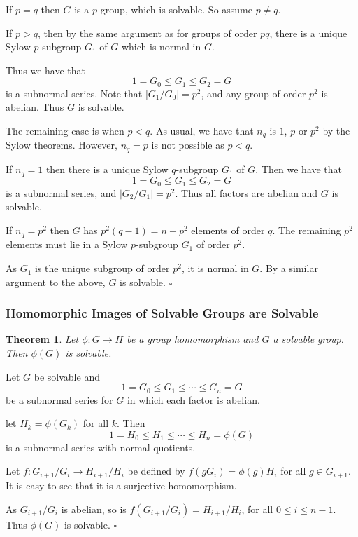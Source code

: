 \documentclass[10pt]{article}
\newtheorem{theorem}{Theorem}[section]
\newenvironment{proof}[1][Proof]{\begin{trivlist}
\item[\hskip \labelsep {\itshape #1}]}{\end{trivlist}}
\begin{document}
\begin{proof}
If $p = q$ then $G$ is a $p$-group, which is solvable. So assume $p \neq q$.

If $p > q$, then by the same argument as for groups of order $pq$, there is a unique Sylow $p$-subgroup $G_1$ of $G$ which is normal in $G$.

Thus we have that
$$1 = G_0 \leq G_1 \leq G_2 = G$$
is a subnormal series. Note that $|G_1/G_0| = p^2$, and any group of order $p^2$ is abelian. Thus $G$ is solvable.

The remaining case is when $p < q$. As usual, we have that $n_q$ is $1$, $p$ or $p^2$ by the Sylow theorems. However, $n_q = p$ is not possible as $p < q$.

If $n_q = 1$ then there is a unique Sylow $q$-subgroup $G_1$ of $G$. Then we have that
$$1 = G_0 \leq G_1 \leq G_2 = G$$
is a subnormal series, and $|G_2/G_1| = p^2$. Thus all factors are abelian and $G$ is solvable.

If $n_q = p^2$ then $G$ has $p^2(q - 1) = n - p^2$ elements of order $q$. The remaining $p^2$ elements must lie in a Sylow $p$-subgroup $G_1$ of order $p^2$.

As $G_1$ is the unique subgroup of order $p^2$, it is normal in $G$. By a similar argument to the above, $G$ is solvable. $\square$
\end{proof}

\subsubsection{Homomorphic Images of Solvable Groups are Solvable}

\begin{theorem}
Let $\phi : G \to H$ be a group homomorphism and $G$ a solvable group. Then $\phi(G)$ is solvable.
\end{theorem}

\begin{proof}
Let $G$ be solvable and
$$1 = G_0 \leq G_1 \leq \cdots \leq G_n = G$$
be a subnormal series for $G$ in which each factor is abelian.

let $H_k = \phi(G_k)$ for all $k$. Then
$$1 = H_0 \leq H_1 \leq \cdots \leq H_n = \phi(G)$$
is a subnormal series with normal quotients.

Let $f : G_{i+1}/G_i \to H_{i+1}/H_i$ be defined by $f(gG_i) = \phi(g)H_i$ for all $g \in G_{i+1}$. It is easy to see that it is a surjective homomorphism.

As $G_{i+1}/G_i$ is abelian, so is $f(G_{i+1}/G_i) = H_{i+1}/H_i$, for all $0 \leq i \leq n - 1$. Thus $\phi(G)$ is solvable. $\square$
\end{proof}
\end{document}

